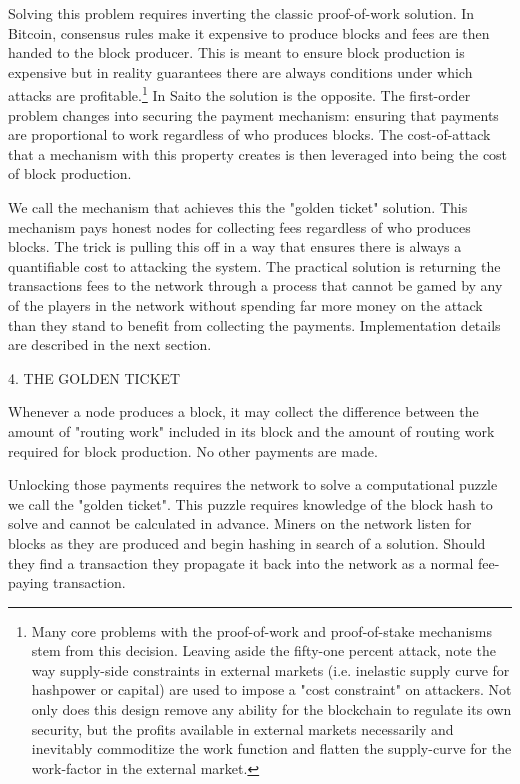 \documentclass[11pt, oneside]{article}   	%
\begin{document}
\begin{multicols}{2}
Solving this problem requires inverting the classic proof-of-work solution. In Bitcoin, consensus rules make it expensive to produce blocks and fees are then handed to the block producer. This is meant to ensure block production is expensive but in reality guarantees there are always conditions under which attacks are profitable.\footnote[1]{Many core problems with the proof-of-work and proof-of-stake mechanisms stem from this decision. Leaving aside the fifty-one percent attack, note the way supply-side constraints in external markets (i.e. inelastic supply curve for hashpower or capital) are used to impose a "cost constraint" on attackers. Not only does this design remove any ability for the blockchain to regulate its own security, but the profits available in external markets necessarily and inevitably commoditize the work function and flatten the supply-curve for the work-factor in the external market.} In Saito the solution is the opposite. The first-order problem changes into securing the payment mechanism: ensuring that payments are proportional to work regardless of who produces blocks. The cost-of-attack that a mechanism with this property creates is then leveraged into being the cost of block production.

We call the mechanism that achieves this the "golden ticket" solution. This mechanism pays honest nodes for collecting fees regardless of who produces blocks. The trick is pulling this off in a way that ensures there is always a quantifiable cost to attacking the system. The practical solution is returning the transactions fees to the network through a process that cannot be gamed by any of the players in the network without spending far more money on the attack than they stand to benefit from collecting the payments. Implementation details are described in the next section.

4. THE GOLDEN TICKET

Whenever a node produces a block, it may collect the difference between the amount of "routing work" included in its block and the amount of routing work required for block production. No other payments are made.

Unlocking those payments requires the network to solve a computational puzzle we call the "golden ticket". This puzzle requires knowledge of the block hash to solve and cannot be calculated in advance. Miners on the network listen for blocks as they are produced and begin hashing in search of a solution. Should they find a transaction they propagate it back into the network as a normal fee-paying transaction.


\end{multicols}
\end{document}
